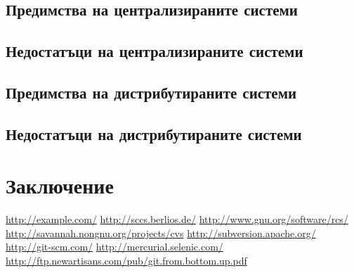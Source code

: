 \documentclass[a4paper]{article}
\begin{document}
  \subsection{Предимства на централизираните системи}
  \subsection{Недостатъци на централизираните системи}
  \subsection{Предимства на дистрибутираните системи}
  \subsection{Недостатъци на дистрибутираните системи}

\section{Заключение}

\newpage

\begin{thebibliography}{99}
   \url{http://example.com/} 
  \url{http://sccs.berlios.de/} 
  \url{http://www.gnu.org/software/rcs/} 
  \url{http://savannah.nongnu.org/projects/cvs} 
  \url{http://subversion.apache.org/}  \url{http://git-scm.com/}
   \url{http://mercurial.selenic.com/}
  \url{http://ftp.newartisans.com/pub/git.from.bottom.up.pdf}
  \end{thebibliography}
\end{document}
